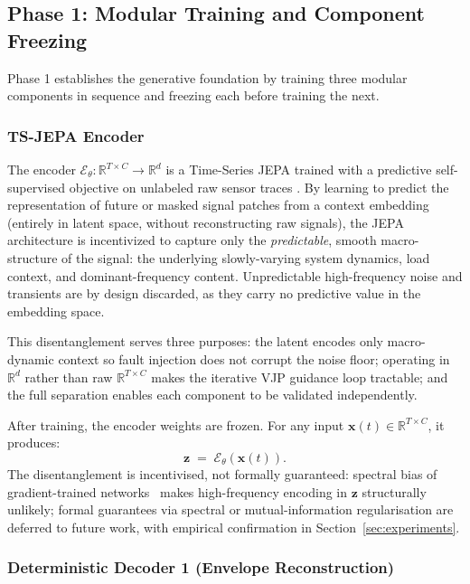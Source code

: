 \documentclass[conference]{IEEEtran}
\newcommand{\Enc}{\mathcal{E}}
\newcommand{\z}{\mathbf{z}}
\newcommand{\x}{\mathbf{x}}
\begin{document}
\subsection{Phase 1: Modular Training and Component Freezing}

Phase 1 establishes the generative foundation by training three modular components in sequence and freezing each before training the next.

\subsubsection{TS-JEPA Encoder}

The encoder $\Enc_\theta:\mathbb{R}^{T\times C}\to\mathbb{R}^{d}$ is a Time-Series JEPA trained with a predictive self-supervised objective on unlabeled raw sensor traces \cite{jepa2024}. By learning to predict the representation of future or masked signal patches from a context embedding (entirely in latent space, without reconstructing raw signals), the JEPA architecture is incentivized to capture only the \emph{predictable}, smooth macro-structure of the signal: the underlying slowly-varying system dynamics, load context, and dominant-frequency content. Unpredictable high-frequency noise and transients are by design discarded, as they carry no predictive value in the embedding space.

This disentanglement serves three purposes: the latent encodes only macro-dynamic context so fault injection does not corrupt the noise floor; operating in $\mathbb{R}^d$ rather than raw $\mathbb{R}^{T\times C}$ makes the iterative VJP guidance loop tractable; and the full separation enables each component to be validated independently.

After training, the encoder weights are frozen. For any input $\x(t)\in\mathbb{R}^{T\times C}$, it produces:
\begin{equation}
  \z \;=\; \Enc_\theta\!\left(\x(t)\right).
  \label{eq:encoder}
\end{equation}
The disentanglement is incentivised, not formally guaranteed: spectral bias of gradient-trained networks~\cite{rahaman2019spectral} makes high-frequency encoding in $\z$ structurally unlikely; formal guarantees via spectral or mutual-information regularisation are deferred to future work, with empirical confirmation in Section~\ref{sec:experiments}.

\subsubsection{Deterministic Decoder 1 (Envelope Reconstruction)}
\end{document}
